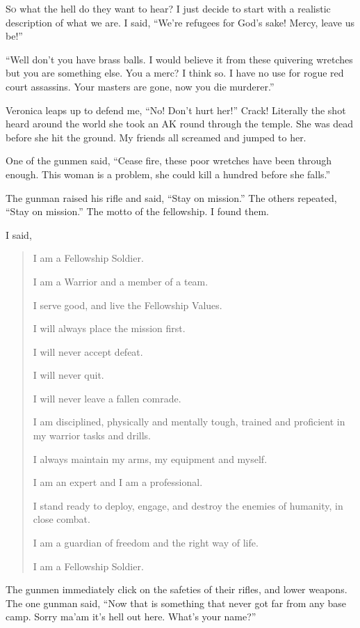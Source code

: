 \lettrine[lines=2,lraise=0]{S}o what the hell do they want to hear? I just decide to start with a realistic description of what we are. I said, ``We're refugees for God's sake! Mercy, leave us be!''

``Well don't you have brass balls. I would believe it from these quivering wretches but you are something else. You a merc? I think so. I have no use for rogue red court assassins. Your masters are gone, now you die murderer.''

Veronica leaps up to defend me, ``No! Don't hurt her!'' Crack! Literally the shot heard around the world she took an AK round through the temple. She was dead before she hit the ground. My friends all screamed and jumped to her.

One of the gunmen said, ``Cease fire, these poor wretches have been through enough. This woman is a problem, she could kill a hundred before she falls.''

The gunman raised his rifle and said, ``Stay on mission.'' The others repeated, ``Stay on mission.'' The motto of the fellowship. I found them.

I said, 

\begin{quote}
	    I am a Fellowship Soldier.
	    
	    I am a Warrior and a member of a team.
	    
	    I serve good, and live the Fellowship Values.
	    
	    I will always place the mission first.
	    
	    I will never accept defeat.
	    
	    I will never quit.
	    
	    I will never leave a fallen comrade.
	    
	    I am disciplined, physically and mentally tough, trained and proficient in my warrior tasks and drills.
	    
	    I always maintain my arms, my equipment and myself.
	    
	    I am an expert and I am a professional.
	    
	    I stand ready to deploy, engage, and destroy the enemies of humanity, in close combat.
	    
	    I am a guardian of freedom and the right way of life.
	    
	    I am a Fellowship Soldier.
\end{quote}

The gunmen immediately click on the safeties of their rifles, and lower weapons. The one gunman said, ``Now that is something that never got far from any base camp. Sorry ma'am it's hell out here. What's your name?''

